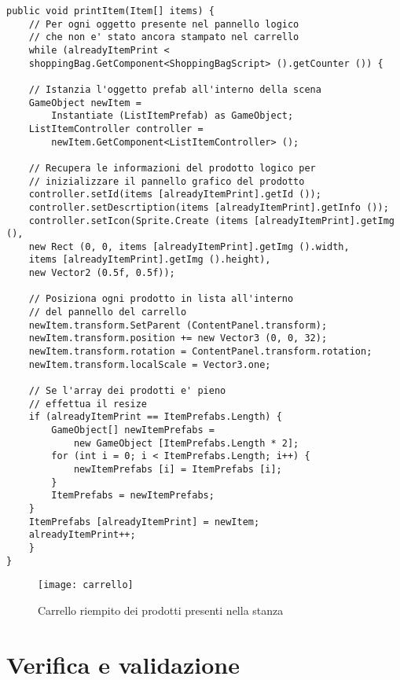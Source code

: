 \begin{lstlisting}[style=MyCStyle]
public void printItem(Item[] items) {
	// Per ogni oggetto presente nel pannello logico
	// che non e' stato ancora stampato nel carrello
	while (alreadyItemPrint < 
	shoppingBag.GetComponent<ShoppingBagScript> ().getCounter ()) {

	// Istanzia l'oggetto prefab all'interno della scena
	GameObject newItem = 
		Instantiate (ListItemPrefab) as GameObject;
	ListItemController controller = 
		newItem.GetComponent<ListItemController> ();

	// Recupera le informazioni del prodotto logico per 
	// inizializzare il pannello grafico del prodotto
	controller.setId(items [alreadyItemPrint].getId ());
	controller.setDescrtiption(items [alreadyItemPrint].getInfo ());
	controller.setIcon(Sprite.Create (items [alreadyItemPrint].getImg (), 
	new Rect (0, 0, items [alreadyItemPrint].getImg ().width, 
	items [alreadyItemPrint].getImg ().height), 
	new Vector2 (0.5f, 0.5f));

	// Posiziona ogni prodotto in lista all'interno
	// del pannello del carrello
	newItem.transform.SetParent (ContentPanel.transform);
	newItem.transform.position += new Vector3 (0, 0, 32);
	newItem.transform.rotation = ContentPanel.transform.rotation;
	newItem.transform.localScale = Vector3.one;

	// Se l'array dei prodotti e' pieno
	// effettua il resize
	if (alreadyItemPrint == ItemPrefabs.Length) {
		GameObject[] newItemPrefabs = 
			new GameObject [ItemPrefabs.Length * 2];
		for (int i = 0; i < ItemPrefabs.Length; i++) {
			newItemPrefabs [i] = ItemPrefabs [i];
		}
		ItemPrefabs = newItemPrefabs;
	}
	ItemPrefabs [alreadyItemPrint] = newItem;
	alreadyItemPrint++;
	}
}
\end{lstlisting}

\label{Carrello}
\begin{figure}[ht]
	\begin{center}
		\texttt{[image: carrello]}
		\caption{Carrello riempito dei prodotti presenti nella stanza}
	\end{center}
\end{figure}
\FloatBarrier 

\section{Verifica e validazione}

